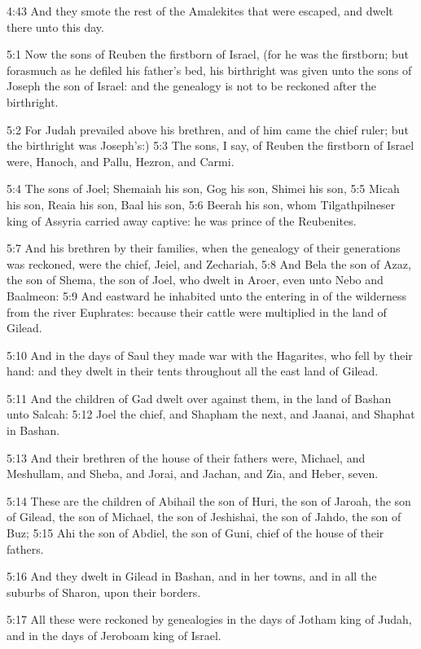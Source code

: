 4:43 And they smote the rest of the Amalekites that were escaped, and
dwelt there unto this day.

5:1 Now the sons of Reuben the firstborn of Israel, (for he was the
firstborn; but forasmuch as he defiled his father's bed, his
birthright was given unto the sons of Joseph the son of Israel: and
the genealogy is not to be reckoned after the birthright.

5:2 For Judah prevailed above his brethren, and of him came the chief
ruler; but the birthright was Joseph's:) 5:3 The sons, I say, of
Reuben the firstborn of Israel were, Hanoch, and Pallu, Hezron, and
Carmi.

5:4 The sons of Joel; Shemaiah his son, Gog his son, Shimei his son,
5:5 Micah his son, Reaia his son, Baal his son, 5:6 Beerah his son,
whom Tilgathpilneser king of Assyria carried away captive: he was
prince of the Reubenites.

5:7 And his brethren by their families, when the genealogy of their
generations was reckoned, were the chief, Jeiel, and Zechariah, 5:8
And Bela the son of Azaz, the son of Shema, the son of Joel, who dwelt
in Aroer, even unto Nebo and Baalmeon: 5:9 And eastward he inhabited
unto the entering in of the wilderness from the river Euphrates:
because their cattle were multiplied in the land of Gilead.

5:10 And in the days of Saul they made war with the Hagarites, who
fell by their hand: and they dwelt in their tents throughout all the
east land of Gilead.

5:11 And the children of Gad dwelt over against them, in the land of
Bashan unto Salcah: 5:12 Joel the chief, and Shapham the next, and
Jaanai, and Shaphat in Bashan.

5:13 And their brethren of the house of their fathers were, Michael,
and Meshullam, and Sheba, and Jorai, and Jachan, and Zia, and Heber,
seven.

5:14 These are the children of Abihail the son of Huri, the son of
Jaroah, the son of Gilead, the son of Michael, the son of Jeshishai,
the son of Jahdo, the son of Buz; 5:15 Ahi the son of Abdiel, the son
of Guni, chief of the house of their fathers.

5:16 And they dwelt in Gilead in Bashan, and in her towns, and in all
the suburbs of Sharon, upon their borders.

5:17 All these were reckoned by genealogies in the days of Jotham king
of Judah, and in the days of Jeroboam king of Israel.

